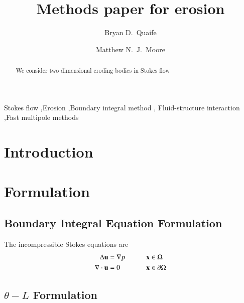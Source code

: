 \documentclass[preprint, 10pt]{elsarticle}
\begin{document}
\title{Methods paper for erosion}

\author[fsu1]{Bryan D.~Quaife} 
\author[fsu2]{Matthew N.~J.~Moore}
\address[fsu1]{Department of Scientific Computing, Florida State
University, Tallahassee, FL, 32306.}
\address[fsu2]{Department of Mathematics, Florida State University,
Tallahassee, FL, 32306.}

\begin{abstract} 
We consider two dimensional eroding bodies in Stokes flow
\end{abstract}

\begin{keyword}
  Stokes flow \sep Erosion \sep Boundary integral method \sep
  Fluid-structure interaction \sep Fast multipole methods 
\end{keyword}

\maketitle

\section{Introduction\label{s:intro}}
\cite{moo-ris-chi-zha-she2013}



\section{Formulation\label{s:formulation}} 

\subsection{Boundary Integral Equation Formulation} 
The incompressible Stokes equations are
\begin{alignat*}{3}
  \Delta {\mathbf{u}} &= {\nabla} p  \qquad && {\mathbf{x}} \in \Omega \\
  {\nabla} \cdot {\mathbf{u}} &= 0   && {\mathbf{x}} \in {\partial}\Omega
\end{alignat*}


\subsection{$\theta-L$ Formulation} 
\end{document}

